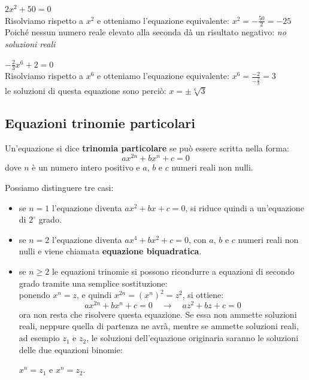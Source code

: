 \begin{esempio}
\(2x^2 +50=0\)
\\[4pt]
Risolviamo rispetto a \(x^2\) e otteniamo l'equazione equivalente: \(x^2=-\frac{50}{2}=-25\)
\\[4pt]
Poiché nessun numero reale elevato alla seconda dà un risultato 
negativo: \emph{no soluzioni reali}
\end{esempio}    

\begin{esempio}
\(-\frac{2}{3}x^6+2=0\)
\\[4pt]
Risolviamo rispetto a \(x^6\) e otteniamo l'equazione equivalente: \quad 
\(x^6=\frac{-2}{-\frac{2}{3}}=3\)\\[4pt]
le soluzioni di questa equazione sono perciò: \(x=\pm \sqrt[6]{3}\)
\end{esempio}

\subsection{Equazioni trinomie particolari}

\begin{definizione}
Un'equazione si dice \textbf{trinomia particolare} se può essere scritta nella 
forma:
\[ax^{2n}+bx^n+c=0\]
dove \(n\) è un numero intero positivo e \(a\), \(b\) e \(c\)  numeri reali  non 
nulli. 
\end{definizione}

Possiamo distinguere tre casi:
\begin{itemize}
\item se \(n=1\) l'equazione diventa \(ax^{2}+bx+c=0\), si riduce 
quindi a un'equazione di \(2^\circ\) grado.
\item se \(n=2\) l'equazione diventa \(ax^{4}+bx^2+c=0\), con \(a\), 
\(b\) e \(c\) numeri reali  non nulli e viene chiamata \textbf{equazione 
biquadratica}.
\item se \(n\geq 2\) le equazioni trinomie si possono ricondurre a 
equazioni di secondo grado tramite una semplice sostituzione:\\[4pt]
ponendo \(x^n=z\), e quindi \(x^{2n}=(x^n)^2=z^2\), si ottiene:
\[ax^{2n}+bx^n+c=0 \quad \longrightarrow \quad az^{2}+bz+c=0\]
ora non resta che risolvere questa equazione. Se essa non ammette  
soluzioni reali, neppure quella di partenza ne avrà, mentre se ammette soluzioni reali, ad esempio \(z_1\) e \(z_2\), le soluzioni 
dell'equazione originaria saranno le soluzioni delle due equazioni 
binomie:
\begin{center}
  \(x^n=z_1\) e \(x^n=z_2\).
\end{center}
\end{itemize}


